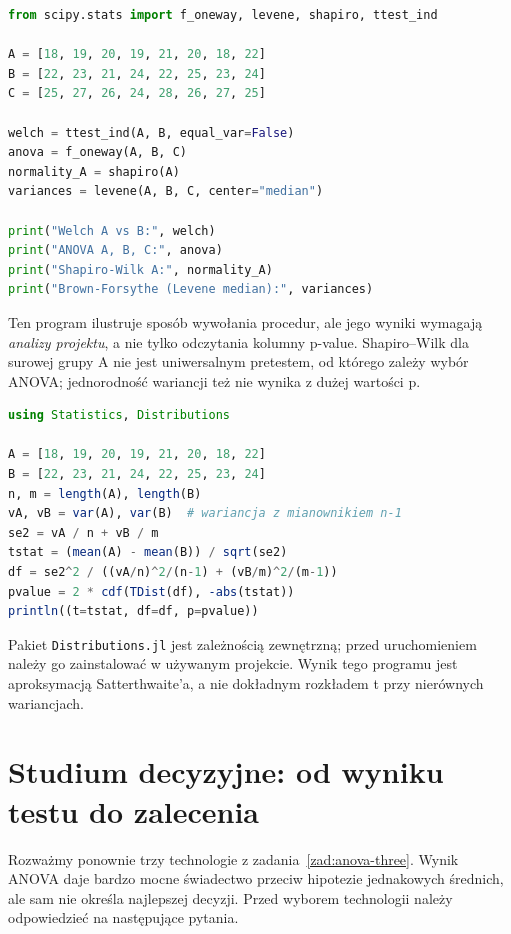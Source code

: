 \documentclass[11pt,a4paper,oneside]{report}
\numberwithin{equation}{chapter}
\theoremstyle{plain}
\theoremstyle{definition}
\theoremstyle{remark}
\begin{document}
\begin{lstlisting}[language=Python,caption={Kompletny przykład: Welch, ANOVA i diagnostyka w Pythonie (SciPy).}]
from scipy.stats import f_oneway, levene, shapiro, ttest_ind

A = [18, 19, 20, 19, 21, 20, 18, 22]
B = [22, 23, 21, 24, 22, 25, 23, 24]
C = [25, 27, 26, 24, 28, 26, 27, 25]

welch = ttest_ind(A, B, equal_var=False)
anova = f_oneway(A, B, C)
normality_A = shapiro(A)
variances = levene(A, B, C, center="median")

print("Welch A vs B:", welch)
print("ANOVA A, B, C:", anova)
print("Shapiro-Wilk A:", normality_A)
print("Brown-Forsythe (Levene median):", variances)
\end{lstlisting}

Ten program ilustruje sposób wywołania procedur, ale jego
wyniki wymagają \emph{analizy projektu}, a nie tylko odczytania
kolumny p-value. Shapiro--Wilk dla surowej grupy A nie jest
uniwersalnym pretestem, od którego zależy wybór ANOVA;
jednorodność wariancji też nie wynika z dużej wartości p.

\begin{lstlisting}[language=Julia,caption={Porównanie grup metodą Welcha w Julii: obliczenie statystyki i p-value.}]
using Statistics, Distributions

A = [18, 19, 20, 19, 21, 20, 18, 22]
B = [22, 23, 21, 24, 22, 25, 23, 24]
n, m = length(A), length(B)
vA, vB = var(A), var(B)  # wariancja z mianownikiem n-1
se2 = vA / n + vB / m
tstat = (mean(A) - mean(B)) / sqrt(se2)
df = se2^2 / ((vA/n)^2/(n-1) + (vB/m)^2/(m-1))
pvalue = 2 * cdf(TDist(df), -abs(tstat))
println((t=tstat, df=df, p=pvalue))
\end{lstlisting}

Pakiet \texttt{Distributions.jl} jest zależnością zewnętrzną;
przed uruchomieniem należy go zainstalować w używanym projekcie.
Wynik tego programu jest aproksymacją Satterthwaite'a,
a nie dokładnym rozkładem t przy nierównych wariancjach.

\section{Studium decyzyjne: od wyniku testu do zalecenia}
Rozważmy ponownie trzy technologie z zadania~\ref{zad:anova-three}.
Wynik ANOVA daje bardzo mocne świadectwo przeciw hipotezie
jednakowych średnich, ale sam nie określa najlepszej decyzji.
Przed wyborem technologii należy odpowiedzieć na następujące
pytania.
\end{document}
